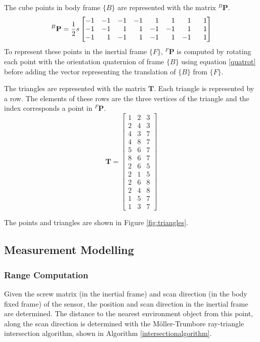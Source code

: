 The cube points in body frame $\{B\}$ are represented with the matrix ${^{B}\mathbf{P}}$.
\begin{equation}
	{^{B}\mathbf{P}} = \frac{1}{2}s
	\begin{bmatrix*}[r]
		-1  &  -1  &  -1  &  -1  &   1  &   1  &   1  &  \hspace{0.75em} 1 \\
		-1  &  -1  &   1  &   1  &  -1  &  -1  &   1  &  1 \\
		-1  &   1  &  -1  &   1  &  -1  &   1  &  -1  &  1 
	\end{bmatrix*}
\end{equation}
To represent these points in the inertial frame $\{F\}$, ${^{F}\mathbf{P}}$ is computed by rotating each point with the orientation quaternion of frame $\{B\}$ using equation \ref{quatrot} before adding the vector representing the translation of $\{B\}$ from $\{F\}$.

The triangles are represented with the matrix $\mathbf{T}$. Each triangle is represented by a row. The elements of these rows are the three vertices of the triangle and the index corresponds a point in ${^{F}\mathbf{P}}$.
\begin{equation}
	\mathbf{T} = 
	\begin{bmatrix}
	1 & 2 & 3 \\
	2 & 4 & 3 \\
    4 & 3 & 7 \\
    4 & 8 & 7 \\
    5 & 6 & 7 \\
    8 & 6 & 7 \\
    2 & 6 & 5 \\
    2 & 1 & 5 \\
    2 & 6 & 8 \\
    2 & 4 & 8 \\
    1 & 5 & 7 \\
    1 & 3 & 7
	\end{bmatrix}
\end{equation}

The points and triangles are shown in Figure \ref{fig:triangles}.


\subsection{Measurement Modelling}
	\subsubsection{Range Computation}
	Given the screw matrix (in the inertial frame) and scan direction (in the body fixed frame) of the sensor, the position and scan direction in the inertial frame are determined.
	The distance to the nearest environment object from this point, along the scan direction is determined with the M{\"o}ller-Trumbore ray-triangle intersection algorithm, shown in Algorithm \ref{intersectionalgorithm}.
	
